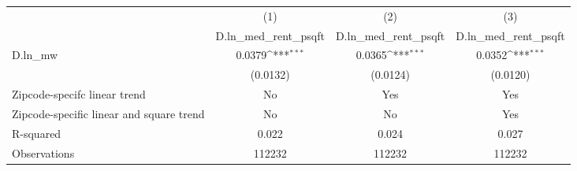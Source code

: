 {
\def\sym#1{\ifmmode^{#1}\else\(^{#1}\)\fi}
\begin{tabular}{l*{3}{c}}
\hline\hline
          &\multicolumn{1}{c}{(1)}&\multicolumn{1}{c}{(2)}&\multicolumn{1}{c}{(3)}\\
          &\multicolumn{1}{c}{D.ln\_med\_rent\_psqft}&\multicolumn{1}{c}{D.ln\_med\_rent\_psqft}&\multicolumn{1}{c}{D.ln\_med\_rent\_psqft}\\
\hline
D.ln\_mw   &   0.0379\sym{***}&   0.0365\sym{***}&   0.0352\sym{***}\\
          & (0.0132)         & (0.0124)         & (0.0120)         \\
\hline
Zipcode-specifc linear trend&       No         &      Yes         &      Yes         \\
Zipcode-specific linear and square trend&       No         &       No         &      Yes         \\
R-squared &    0.022         &    0.024         &    0.027         \\
Observations&   112232         &   112232         &   112232         \\
\hline\hline
\end{tabular}
}
